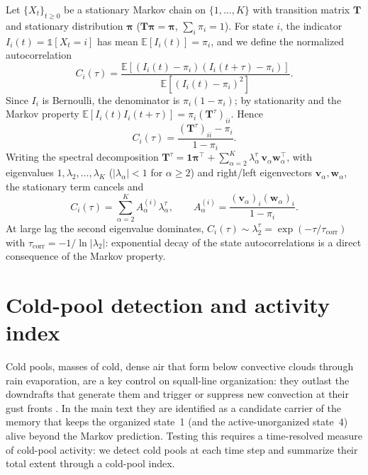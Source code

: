\documentclass[
    aps,
    prl,
    reprint,
    superscriptaddress,
    amsmath,amssymb,
    nofootinbib,
    floatfix
]{revtex4-2}
\begin{document}
Let $\{X_t\}_{t\ge 0}$ be a stationary Markov chain on $\{1,\dots,K\}$ with transition matrix $\mathbf{T}$ and stationary distribution $\boldsymbol{\pi}$ ($\mathbf{T}\boldsymbol{\pi}=\boldsymbol{\pi}$, $\sum_i\pi_i=1$). For state $i$, the indicator $I_i(t)=\mathbb{1}[X_t=i]$ has mean $\mathbb{E}[I_i(t)]=\pi_i$, and we define the normalized autocorrelation
\begin{equation}
    C_i(\tau)
    =
    \frac{\mathbb{E}\!\left[(I_i(t)-\pi_i)(I_i(t+\tau)-\pi_i)\right]}
         {\mathbb{E}\!\left[(I_i(t)-\pi_i)^2\right]}.
    \label{eq:autocorr_def}
\end{equation}
Since $I_i$ is Bernoulli, the denominator is $\pi_i(1-\pi_i)$; by stationarity and the Markov property $\mathbb{E}[I_i(t)I_i(t+\tau)]=\pi_i(\mathbf{T}^\tau)_{ii}$. Hence
\begin{equation}
    C_i(\tau)=\frac{(\mathbf{T}^\tau)_{ii}-\pi_i}{1-\pi_i}.
\end{equation}
Writing the spectral decomposition $\mathbf{T}^\tau=\mathbf{1}\boldsymbol{\pi}^\top+\sum_{\alpha=2}^K\lambda_\alpha^\tau\,\mathbf{v}_\alpha\mathbf{w}_\alpha^\top$, with eigenvalues $1,\lambda_2,\dots,\lambda_K$ ($|\lambda_\alpha|<1$ for $\alpha\ge2$) and right/left eigenvectors $\mathbf{v}_\alpha,\mathbf{w}_\alpha$, the stationary term cancels and
\begin{equation}
    C_i(\tau)=\sum_{\alpha=2}^K A_\alpha^{(i)}\lambda_\alpha^\tau,
    \qquad
    A_\alpha^{(i)}=\frac{(\mathbf{v}_\alpha)_i(\mathbf{w}_\alpha)_i}{1-\pi_i}.
\end{equation}
At large lag the second eigenvalue dominates, $C_i(\tau)\sim\lambda_2^\tau=\exp(-\tau/\tau_{\mathrm{corr}})$ with $\tau_{\mathrm{corr}}=-1/\ln|\lambda_2|$: exponential decay of the state autocorrelations is a direct consequence of the Markov property.

\section{Cold-pool detection and activity index}

Cold pools, masses of cold, dense air that form below convective clouds through rain evaporation, are a key control on squall-line organization: they outlast the downdrafts that generate them and trigger or suppress new convection at their gust fronts \cite{rotunno1988theory, houze1977structure, tompkins2001coldpools, abramian2022shear, torri2015mechanisms}. In the main text they are identified as a candidate carrier of the memory that keeps the organized state~1 (and the active-unorganized state~4) alive beyond the Markov prediction. Testing this requires a time-resolved measure of cold-pool activity: we detect cold pools at each time step and summarize their total extent through a cold-pool index.
\end{document}
